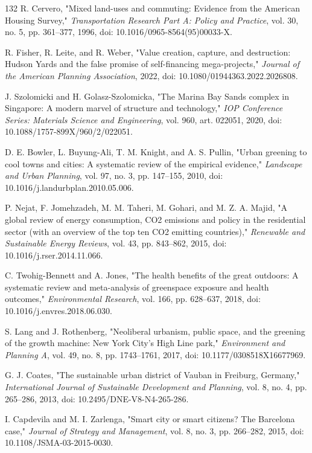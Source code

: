 \documentclass[pdflatex,sn-mathphys-num]{sn-jnl}%
\theoremstyle{thmstyleone}%
\theoremstyle{thmstyletwo}%
\theoremstyle{thmstylethree}%
\begin{document}
\begin{thebibliography}{132}
 R. Cervero, "Mixed land-uses and commuting: Evidence from the American Housing Survey," \emph{Transportation Research Part A: Policy and Practice}, vol. 30, no. 5, pp. 361--377, 1996, doi: 10.1016/0965-8564(95)00033-X.

 R. Fisher, R. Leite, and R. Weber, "Value creation, capture, and destruction: Hudson Yards and the false promise of self-financing mega-projects," \emph{Journal of the American Planning Association}, 2022, doi: 10.1080/01944363.2022.2026808.

 J. Szolomicki and H. Golasz-Szolomicka, "The Marina Bay Sands complex in Singapore: A modern marvel of structure and technology," \emph{IOP Conference Series: Materials Science and Engineering}, vol. 960, art. 022051, 2020, doi: 10.1088/1757-899X/960/2/022051.

 D. E. Bowler, L. Buyung-Ali, T. M. Knight, and A. S. Pullin, "Urban greening to cool towns and cities: A systematic review of the empirical evidence," \emph{Landscape and Urban Planning}, vol. 97, no. 3, pp. 147--155, 2010, doi: 10.1016/j.landurbplan.2010.05.006.

 P. Nejat, F. Jomehzadeh, M. M. Taheri, M. Gohari, and M. Z. A. Majid, "A global review of energy consumption, CO2 emissions and policy in the residential sector (with an overview of the top ten CO2 emitting countries)," \emph{Renewable and Sustainable Energy Reviews}, vol. 43, pp. 843--862, 2015, doi: 10.1016/j.rser.2014.11.066.

 C. Twohig-Bennett and A. Jones, "The health benefits of the great outdoors: A systematic review and meta-analysis of greenspace exposure and health outcomes," \emph{Environmental Research}, vol. 166, pp. 628--637, 2018, doi: 10.1016/j.envres.2018.06.030.

 S. Lang and J. Rothenberg, "Neoliberal urbanism, public space, and the greening of the growth machine: New York City's High Line park," \emph{Environment and Planning A}, vol. 49, no. 8, pp. 1743--1761, 2017, doi: 10.1177/0308518X16677969.

 G. J. Coates, "The sustainable urban district of Vauban in Freiburg, Germany," \emph{International Journal of Sustainable Development and Planning}, vol. 8, no. 4, pp. 265--286, 2013, doi: 10.2495/DNE-V8-N4-265-286.

 I. Capdevila and M. I. Zarlenga, "Smart city or smart citizens? The Barcelona case," \emph{Journal of Strategy and Management}, vol. 8, no. 3, pp. 266--282, 2015, doi: 10.1108/JSMA-03-2015-0030.


\end{thebibliography}
\end{document}
